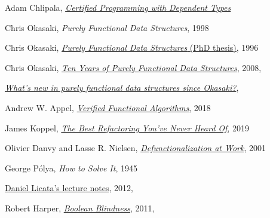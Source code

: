 \documentclass[declaration,mgr,english,shortabstract]{iithesis}
\begin{document}
\begin{thebibliography}{1}
    Adam Chlipala,
    \href{http://adam.chlipala.net/cpdt/}{\textit{Certified Programming with Dependent Types}}

    Chris Okasaki,
    \textit{Purely Functional Data Structures},
    1998

    Chris Okasaki,
    \href{https://www.cs.cmu.edu/~rwh/theses/okasaki.pdf}{\textit{Purely Functional Data Structures} (PhD thesis)},
    1996

    Chris Okasaki,
    \href{https://okasaki.blogspot.com/2008/02/ten-years-of-purely-functional-data.html}{\textit{Ten Years of Purely Functional Data Structures}}, 2008, \\

    \href{https://cstheory.stackexchange.com/questions/1539/whats-new-in-purely-functional-data-structures-since-okasaki}{\textit{What's new in purely functional data structures since Okasaki?}}, \\

    Andrew W. Appel,
    \href{https://softwarefoundations.cis.upenn.edu/vfa-current/index.html}{\textit{Verified Functional Algorithms}}, 2018

    James Koppel,
    \href{http://www.pathsensitive.com/2019/07/the-best-refactoring-youve-never-heard.html}{\textit{The Best Refactoring You've Never Heard Of}},
    2019

    Olivier Danvy and Lasse R. Nielsen,
    \href{https://www.brics.dk/RS/01/23/BRICS-RS-01-23.pdf}{\textit{Defunctionalization at Work}},
    2001

    George Pólya,
    \textit{How to Solve It},
    1945

    \href{https://www.cs.cmu.edu/~15150/previous-semesters/2012-spring/resources/lectures/09.pdf}{Daniel Licata's lecture notes},
    2012, \\

    Robert Harper,
    \href{https://existentialtype.wordpress.com/2011/03/15/boolean-blindness/}{\textit{Boolean Blindness}},
    2011, \\


\end{thebibliography}
\end{document}
